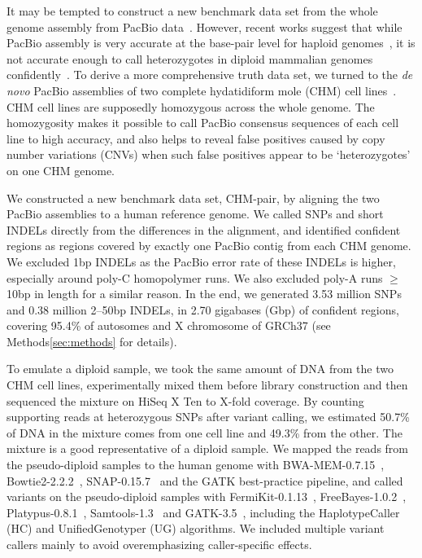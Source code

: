 \documentclass{bioinfo}
\begin{document}
It may be tempted to construct a new benchmark data set from the whole genome
assembly from PacBio data~\citep{Chin:2016aa}. However, recent works suggest that while PacBio
assembly is very accurate at the base-pair level for haploid
genomes~\citep{Chin:2013qr}, it is not accurate enough to call heterozygotes in
diploid mammalian genomes confidently~\citep{Gordon:2016kq,Seo:2016aa}.  To derive a
more comprehensive truth data set, we turned to the \emph{de novo} PacBio
assemblies of two complete hydatidiform mole (CHM) cell
lines~\citep{Schneider072116}. CHM cell lines are supposedly homozygous across
the whole genome. The homozygosity makes it possible to call PacBio consensus
sequences of each cell line to high accuracy, and also helps to reveal false
positives caused by copy number variations (CNVs) when such false positives
appear to be `heterozygotes' on one CHM genome.

We constructed a new benchmark data set, CHM-pair, by aligning the
two PacBio assemblies to a human reference genome. We called SNPs and short
INDELs directly from the differences in the alignment, and identified confident
regions as regions covered by exactly one PacBio contig from each CHM genome.
We excluded 1bp INDELs as the PacBio error rate of these INDELs is higher,
especially around poly-C homopolymer runs. We also excluded poly-A runs
$\ge$10bp in length for a similar reason. In the end, we generated 3.53 million
SNPs and 0.38 million 2--50bp INDELs, in 2.70 gigabases (Gbp) of confident
regions, covering 95.4\% of autosomes and X chromosome of GRCh37 (see
Methods\ref{sec:methods} for details).

To emulate a diploid sample, we took the same amount of DNA from the two CHM
cell lines, experimentally mixed them before library construction and then
sequenced the mixture on HiSeq X Ten to X-fold coverage. By counting supporting
reads at heterozygous SNPs after variant calling, we estimated 50.7\% of DNA in
the mixture comes from one cell line and 49.3\% from the other. The mixture is
a good representative of a diploid sample. We mapped the reads from the
pseudo-diploid samples to the human genome with BWA-MEM-0.7.15~\citep{Li:2013aa},
Bowtie2-2.2.2~\citep{Langmead:2012fk}, SNAP-0.15.7~\citep{Bolosky:2014aa} and
the GATK best-practice pipeline, and called variants on the pseudo-diploid
samples with FermiKit-0.1.13~\citep{Li:2015eu},
FreeBayes-1.0.2~\citep{Garrison:2012aa}, Platypus-0.8.1~\citep{Rimmer:2014ab},
Samtools-1.3~\citep{Li:2011ab} and GATK-3.5~\citep{Depristo:2011vn}, including
the HaplotypeCaller (HC) and UnifiedGenotyper (UG) algorithms. We included
multiple variant callers mainly to avoid overemphasizing caller-specific
effects.
\end{document}
